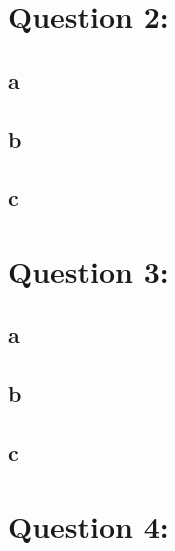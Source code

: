 \documentclass[11pt, oneside]{article}   	%
\begin{document}
\begin{flushleft}
\section*{Question 2:}
\subsection*{a}

\subsection*{b}

\subsection*{c}

\section*{Question 3:}
\subsection*{a}

\subsection*{b}

\subsection*{c}

\section*{Question 4:}

\end{flushleft}
\end{document}
